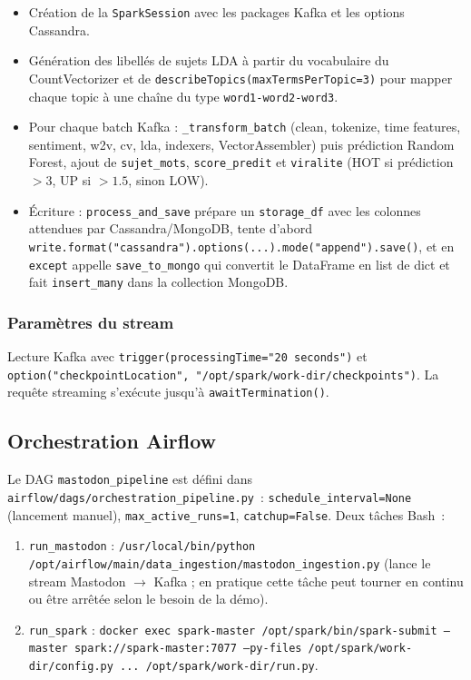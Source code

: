 \documentclass[12pt,a4paper]{article}
\begin{document}
\begin{itemize}[leftmargin=*]
  \item Création de la \texttt{SparkSession} avec les packages Kafka et les options Cassandra.
  \item Génération des libellés de sujets LDA à partir du vocabulaire du CountVectorizer et de \texttt{describeTopics(maxTermsPerTopic=3)} pour mapper chaque topic à une chaîne du type \texttt{word1-word2-word3}.
  \item Pour chaque batch Kafka : \texttt{\_transform\_batch} (clean, tokenize, time features, sentiment, w2v, cv, lda, indexers, VectorAssembler) puis prédiction Random Forest, ajout de \texttt{sujet\_mots}, \texttt{score\_predit} et \texttt{viralite} (HOT si prédiction $>3$, UP si $>1.5$, sinon LOW).
  \item Écriture : \texttt{process\_and\_save} prépare un \texttt{storage\_df} avec les colonnes attendues par Cassandra/MongoDB, tente d'abord \texttt{write.format("cassandra").options(...).mode("append").save()}, et en \texttt{except} appelle \texttt{save\_to\_mongo} qui convertit le DataFrame en list de dict et fait \texttt{insert\_many} dans la collection MongoDB.
\end{itemize}

\subsubsection{Paramètres du stream}

Lecture Kafka avec \texttt{trigger(processingTime="20 seconds")} et \texttt{option("checkpointLocation", "/opt/spark/work-dir/checkpoints")}. La requête streaming s'exécute jusqu'à \texttt{awaitTermination()}.

\subsection{Orchestration Airflow}

Le DAG \texttt{mastodon\_pipeline} est défini dans \texttt{airflow/dags/orchestration\_pipeline.py}~: \texttt{schedule\_interval=None} (lancement manuel), \texttt{max\_active\_runs=1}, \texttt{catchup=False}. Deux tâches Bash~:
\begin{enumerate}[leftmargin=*]
  \item \texttt{run\_mastodon} : \texttt{/usr/local/bin/python /opt/airflow/main/data\_ingestion/mastodon\_ingestion.py} (lance le stream Mastodon $\rightarrow$ Kafka ; en pratique cette tâche peut tourner en continu ou être arrêtée selon le besoin de la démo).
  \item \texttt{run\_spark} : \texttt{docker exec spark-master /opt/spark/bin/spark-submit --master spark://spark-master:7077 --py-files /opt/spark/work-dir/config.py ... /opt/spark/work-dir/run.py}.
\end{enumerate}
\end{document}
